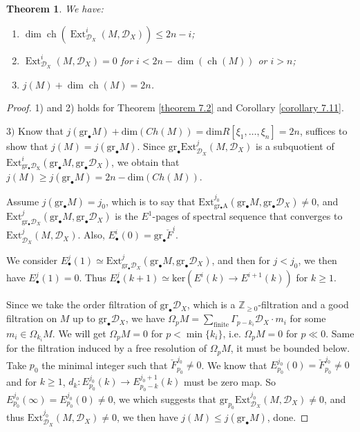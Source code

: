\documentclass[openany]{book}
\newtheorem{theorem}{Theorem}[chapter] %
\theoremstyle{definition} %
\theoremstyle{remark}
\begin{document}
\begin{theorem}\label{theorem 7.12}
    We have:
    \begin{enumerate}
        \item $\dim \operatorname{ch}(\operatorname{Ext}_{\mathcal{D}_X}^i(M, \mathcal{D}_X)) \leq 2n - i$;
        \item $\operatorname{Ext}_{\mathcal{D}_X}^i(M, \mathcal{D}_X) = 0$ for $i < 2n - \dim(\operatorname{ch}(M))$ or $i > n$;
        \item $j(M) + \dim \operatorname{ch}(M) = 2n$.
    \end{enumerate}
\end{theorem}
\begin{proof}
    1) and 2) holds for Theorem \ref{theorem 7.2} and Corollary \ref{corollary 7.11}.

    $3)$ Know that $j(\mathrm{gr}_{\bullet}M)+\mathrm{dim}(Ch(M))=\mathrm{dim}R[\xi_{1},\dots,\xi_{n}]=2n$, suffices to show that $j(M)=j(\mathrm{gr}_{\bullet}M)$. Since $\mathrm{gr}_{\bullet}\mathrm{Ext}_{\mathcal{D}_{X}}^{j}(M,\mathcal{D}_{X})$ is a subquotient of $\mathrm{Ext}^{i}_{\mathrm{gr_{\bullet}\mathcal{D}_{X}}}(\mathrm{gr}_{\bullet}M,\mathrm{gr}_{\bullet}\mathcal{D}_{X})$, we obtain that $j(M)\ge j(\mathrm{gr}_{\bullet}M)=2n-\mathrm{dim}(Ch(M))$.

    Assume $j(\mathrm{gr}_{\bullet}M)=j_{0}$, which is to say that $\mathrm{Ext}^{j_{0}}_{\mathrm{gr_{\bullet}A}}(\mathrm{gr}_{\bullet}M,\mathrm{gr}_{\bullet}\mathcal{D}_{X})\neq 0$, and $\mathrm{Ext}^{j}_{\mathrm{gr}_{\bullet}\mathcal{D}_{X}}(\mathrm{gr}_{\bullet}M,\mathrm{gr}_{\bullet}\mathcal{D}_{X})$ is the $E^{1}$-pages of spectral sequence that converges to $\mathrm{Ext}_{\mathcal{D}_{X}}^{j}(M,\mathcal{D}_{X})$. Also, $E^{i}_{\bullet}(0)=\mathrm{gr}_{\bullet}\check{F}^{i}$.

    We consider $E^{j}_{\bullet}(1)\simeq \mathrm{Ext}^{j}_{\mathrm{gr}_{\bullet}\mathcal{D}_{X}}(\mathrm{gr}_{\bullet}M,\mathrm{gr}_{\bullet}\mathcal{D}_{X})$, and then for $j<j_{0}$, we then have $E^{j}_{\bullet}(1)=0$. Thus $E^{j}_{\bullet}(k+1)\simeq \mathrm{ker}(E^{i}(k)\rightarrow E^{i+1}(k))$ for $k\ge 1$.

    Since we take the order filtration of $\mathrm{gr}_{\bullet}\mathcal{D}_{X}$, which is a $\mathbb{Z}_{\ge 0}$-filtration and a good filtration on $M$ up to $\mathrm{gr}_{\bullet}\mathcal{D}_{X}$, we have $\Omega_{p}M=\sum\limits_{\text{finite}}\Gamma_{p-k_{i}}\mathcal{D}_{X}\cdot m_{i}$ for some $m_{i}\in \Omega_{k_{i}}M$. We will get $\Omega_{p}M=0$ for $p<\min\{k_{i}\}$, i.e. $\Omega_{p}M=0$ for $p\ll0$. Same for the filtration induced by a free resolution of $\Omega_{p}M$, it must be bounded below. Take $p_{0}$ the minimal integer such that $\check{F}^{j_{0}}_{p_{0}}\neq 0$. We know that $E^{j_{0}}_{p_{0}}(0)=\check{F}^{j_{0}}_{p_{0}}\neq 0$ and for $k\ge 1$, $d_{k}:E^{j_{0}}_{p_{0}}(k)\rightarrow E^{j_{0}+1}_{p_{0}-k}(k)$ must be zero map. So $E^{j_{0}}_{p_{0}}(\infty)=E^{j_{0}}_{p_{0}}(0)\neq 0$, we which suggests that $\mathrm{gr}_{p_{0}}\mathrm{Ext}_{\mathcal{D}_{X}}^{j_{0}}(M,\mathcal{D}_{X})\neq 0$, and thus $\mathrm{Ext}_{\mathcal{D}_{X}}^{j_{0}}(M,\mathcal{D}_{X})\neq 0$, we then have $j(M)\leq j(\mathrm{gr}_{\bullet}M)$, done.
\end{proof}
\end{document}
